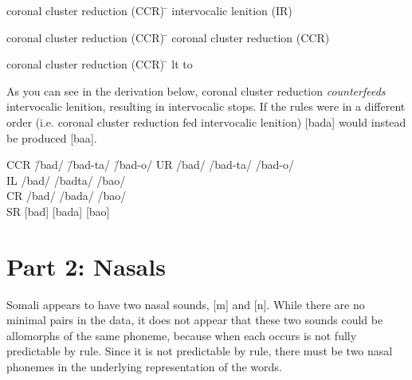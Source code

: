 \documentclass[doc,12pt]{apa6}
\begin{document}
\begin{exe}
	\ex \begin{tabbing}
		coronal cluster reduction (CCR) \= \kill
		intervocalic lenition (IR) \>
		\end{tabbing}

	\ex \begin{tabbing}
		coronal cluster reduction (CCR) \= \kill
		coronal cluster reduction (CCR) \>
		\phonl{\phonfeat{+cor\\-son}}{
	           $\emptyset$}{
	           \phonfeat{+cor\\-son}}
		\end{tabbing}

	\ex \begin{tabbing}
		coronal cluster reduction (CCR) \= \kill
		lt to \textipa{S} \>
		\phon{lt}{\textipa{S}}
	\end{tabbing}

\end{exe}

As you can see in the derivation below, coronal cluster reduction
\emph{counterfeeds} intervocalic lenition, resulting in intervocalic stops.
If the rules were in a different order (i.e. coronal cluster reduction fed
intervocalic lenition) {[}bada{]} would instead be produced
{[}baa{]}.

\begin{exe}
	\ex \begin{tabbing}
		CCR \hspace{2em} \= /bad/ \hspace{2em}
		\= /bad-ta/ \hspace{2em} \= /bad-o/ \kill
		UR  \> /bad/ \> /bad-ta/ \> /bad-o/          \\
		IL  \> /bad/ \> /badta/  \> /bao/ \\
		CR \> /bad/ \> /bada/   \> /bao/ \\
		SR  \> {[}bad{]} \> {[}bada{]} \> {[}ba\textipa{D}o{]}
		\end{tabbing}
\end{exe}

\section{Part 2: Nasals}

Somali appears to have two nasal sounds, {[}m{]} and {[}n{]}. While there are
no minimal pairs in the data, it does not appear that these two sounds could be
allomorphs of the same phoneme, because when each occurs is not fully
predictable by rule. Since it is not predictable by rule, there must be two 
nasal phonemes in the underlying representation of the words.
\end{document}
